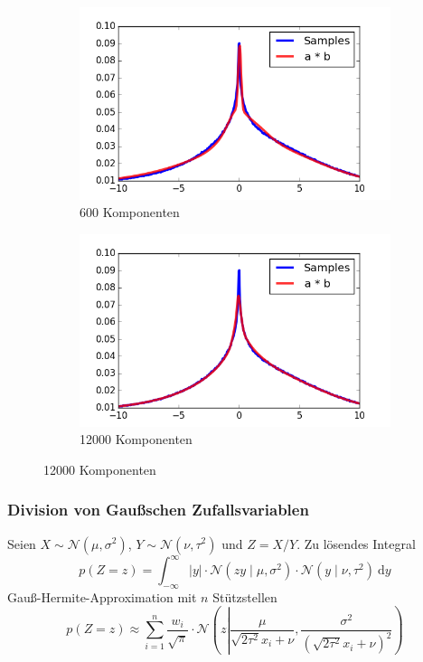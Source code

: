 \documentclass[11pt]{beamer}
\begin{document}
\begin{frame}
\begin{figure}
\begin{subfigure}[t]{0.45\textwidth}
      \includegraphics[width=\textwidth]{thesis/operations/product-hermite-100-components}
      \caption{600 Komponenten}
    \end{subfigure}
    \hfill
    \begin{subfigure}[t]{0.45\textwidth}
      \centering
      \includegraphics[width=\textwidth]{thesis/operations/product-hermite-2000-components}
      \caption{12000 Komponenten}
    \end{subfigure}
  \end{figure}
\end{frame}

\begin{frame}
  \frametitle{Division von Gaußschen Zufallsvariablen}

  Seien $X \sim \mathcal{N}(\mu, \sigma^{2})$,
  $Y \sim \mathcal{N}(\nu, \tau^{2})$ und $Z = X / Y$. \vfill
  Zu lösendes Integral
  \begin{equation*}
    p(Z = z) = \int_{-\infty}^{\infty} |y| \cdot \mathcal{N}\left( zy \mid \mu, \sigma^{2} \right) \cdot \mathcal{N}(y \mid \nu, \tau^{2})~\mathrm{d}y
  \end{equation*}
  \vfill
  Gauß-Hermite-Approximation mit $n$ Stützstellen
  \begin{equation*}
    p(Z = z) \approx \sum_{i = 1}^{n} \frac{w_{i}}{\sqrt{\pi}} \cdot \mathcal{N}\left( z \left| \frac{\mu}{\sqrt{2 \tau^{2}} x_{i} + \nu}, \frac{\sigma^{2}}{\left(\sqrt{2 \tau^{2}} x_{i} + \nu\right)^{2}} \right.\right)
  \end{equation*}
\end{frame}
\end{document}
